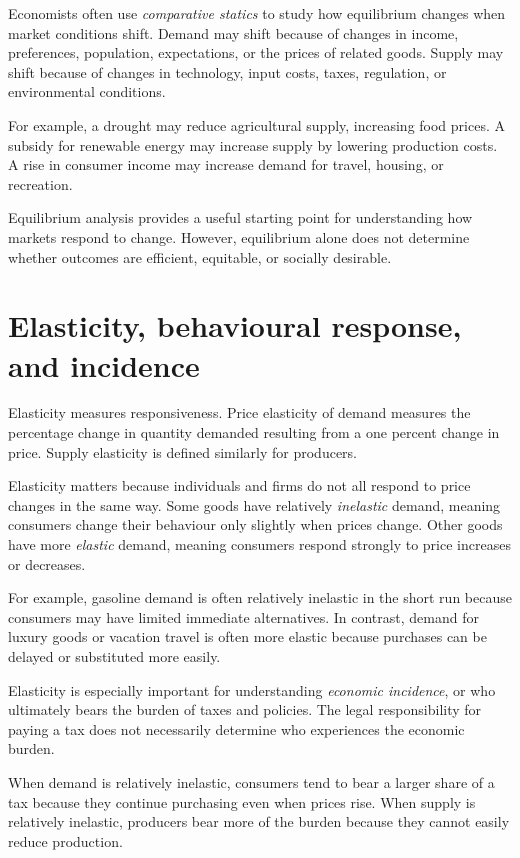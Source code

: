 \documentclass[
  11pt,
  oneside]{book}
\begin{document}
Economists often use \emph{comparative statics} to study how equilibrium changes when market conditions shift. Demand may shift because of changes in income, preferences, population, expectations, or the prices of related goods. Supply may shift because of changes in technology, input costs, taxes, regulation, or environmental conditions.

For example, a drought may reduce agricultural supply, increasing food prices. A subsidy for renewable energy may increase supply by lowering production costs. A rise in consumer income may increase demand for travel, housing, or recreation.

Equilibrium analysis provides a useful starting point for understanding how markets respond to change. However, equilibrium alone does not determine whether outcomes are efficient, equitable, or socially desirable.

\section{Elasticity, behavioural response, and incidence}\label{elasticity-behavioural-response-and-incidence}

Elasticity measures responsiveness. Price elasticity of demand measures the percentage change in quantity demanded resulting from a one percent change in price. Supply elasticity is defined similarly for producers.

Elasticity matters because individuals and firms do not all respond to price changes in the same way. Some goods have relatively \emph{inelastic} demand, meaning consumers change their behaviour only slightly when prices change. Other goods have more \emph{elastic} demand, meaning consumers respond strongly to price increases or decreases.

For example, gasoline demand is often relatively inelastic in the short run because consumers may have limited immediate alternatives. In contrast, demand for luxury goods or vacation travel is often more elastic because purchases can be delayed or substituted more easily.

Elasticity is especially important for understanding \emph{economic incidence}, or who ultimately bears the burden of taxes and policies. The legal responsibility for paying a tax does not necessarily determine who experiences the economic burden.

When demand is relatively inelastic, consumers tend to bear a larger share of a tax because they continue purchasing even when prices rise. When supply is relatively inelastic, producers bear more of the burden because they cannot easily reduce production.
\end{document}
